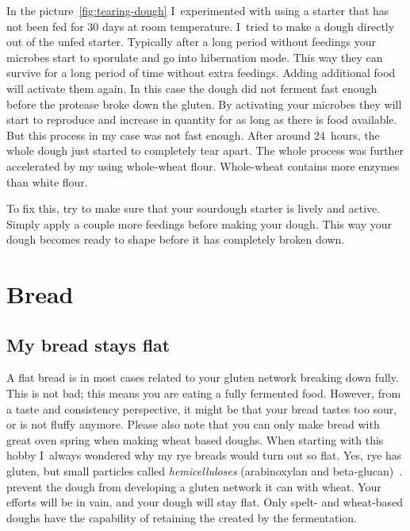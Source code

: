 In the picture~\ref{fig:tearing-dough} I~experimented with
using a starter that has not been fed for 30 days at room temperature.
I~tried to make a dough directly out of the unfed starter.
Typically after a long period
without feedings your microbes start to sporulate and go
into hibernation mode. This way they can survive for a long
period of time without extra feedings. Adding additional food
will activate them again. In this case the dough did not ferment
fast enough before the protease broke down the gluten. By activating
your microbes they will start to reproduce and increase in quantity
for as long as there is food available. But this process
in my case was not fast enough. After around 24~hours, the whole
dough just started to completely tear apart. The whole process was further
accelerated by my using whole-wheat flour. Whole-wheat
contains more enzymes than white flour.

To fix this, try to make sure that your sourdough starter is lively
and active. Simply apply a couple more feedings before
making your dough. This way your dough becomes ready to shape
before it has completely broken down.

\section{Bread}
\subsection{My bread stays flat}

A flat bread is in most cases related to your gluten
network breaking down fully. This is not bad; this
means you are eating a fully fermented food. However,
from a taste and consistency perspective, it might be
that your bread tastes too sour, or is not fluffy anymore.
Please also note that you can only make bread with
great oven spring when making wheat based doughs. When
starting with this hobby I~always wondered why my rye
breads would turn out so flat. Yes, rye has gluten, but
small particles called \emph{hemicelluloses} (arabinoxylan and beta-glucan)~\cite{rye-defects}.
prevent the dough from developing a gluten network it can
with wheat. Your efforts will be in vain, and your dough will
stay flat. Only spelt- and wheat-based doughs have the capability
of retaining the  created by the fermentation.

